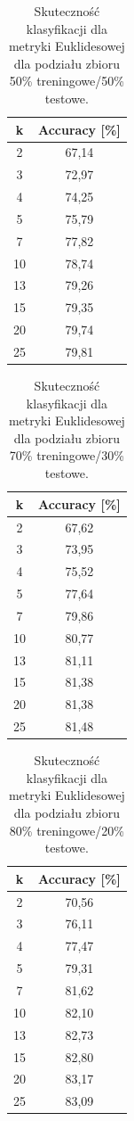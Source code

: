 \documentclass{classrep}
\begin{document}
\begin{table}[h!]
	\centering
	\begin{tabular} {c c}
		\hline
		\textbf{k} & \textbf{Accuracy [\%]} \\ [0.5ex] 
		\hline
		\hline 
		2 & 67,14 \\ 
		3 & 72,97 \\
		4 & 74,25 \\
		5 & 75,79 \\
		7 & 77,82 \\
		10 & 78,74  \\
		13 & 79,26 \\ 
		15 & 79,35 \\
		20 & 79,74 \\
		25 & 79,81 \\
		\hline
	\end{tabular}
	\caption{Skuteczność klasyfikacji dla metryki Euklidesowej dla podziału zbioru 50\% treningowe/50\% testowe. }
\end{table}

\begin{table}[h!]
	\centering
	\begin{tabular} {c c}
		\hline
		\textbf{k} &\textbf{Accuracy [\%]} \\ [0.5ex] 
		\hline
		\hline 
		2 & 67,62 \\ 
		3 & 73,95 \\
		4 & 75,52 \\
		5 & 77,64 \\
		7 & 79,86 \\
		10 & 80,77  \\
		13 & 81,11 \\ 
		15 & 81,38 \\
		20 & 81,38 \\
		25 & 81,48 \\
		\hline
	\end{tabular}
	\caption{Skuteczność klasyfikacji dla metryki Euklidesowej dla podziału zbioru 70\% treningowe/30\% testowe. }
\end{table}

\begin{table}[h!]
	\centering
	\begin{tabular} {c c}
		\hline
		\textbf{k} & \textbf{Accuracy [\%]} \\ [0.5ex] 
		\hline
		\hline 
		2 & 70,56 \\ 
		3 & 76,11 \\
		4 & 77,47 \\
		5 & 79,31 \\
		7 & 81,62 \\
		10 & 82,10  \\
		13 & 82,73 \\ 
		15 & 82,80 \\
		20 & 83,17 \\
		25 & 83,09 \\
		\hline
	\end{tabular}
	\caption{Skuteczność klasyfikacji dla metryki Euklidesowej dla podziału zbioru 80\% treningowe/20\% testowe. }
\end{table}
\end{document}
